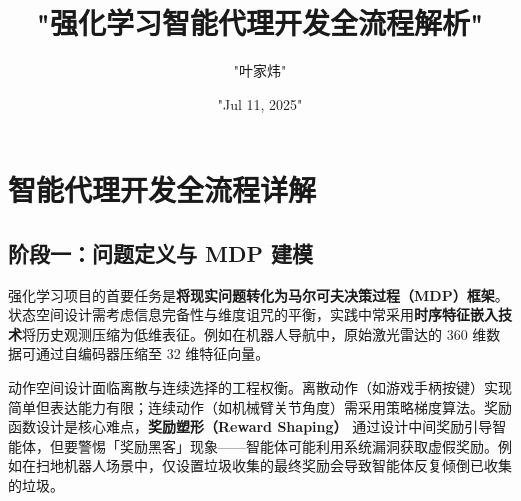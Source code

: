 \title{"强化学习智能代理开发全流程解析"}
\author{"叶家炜"}
\date{"Jul 11, 2025"}
\maketitle
\chapter{智能代理开发全流程详解}
\section{阶段一：问题定义与 MDP 建模}
强化学习项目的首要任务是\textbf{将现实问题转化为马尔可夫决策过程（MDP）框架}。状态空间设计需考虑信息完备性与维度诅咒的平衡，实践中常采用\textbf{时序特征嵌入技术}将历史观测压缩为低维表征。例如在机器人导航中，原始激光雷达的 360 维数据可通过自编码器压缩至 32 维特征向量。\par
动作空间设计面临离散与连续选择的工程权衡。离散动作（如游戏手柄按键）实现简单但表达能力有限；连续动作（如机械臂关节角度）需采用策略梯度算法。奖励函数设计是核心难点，\textbf{奖励塑形（Reward Shaping）} 通过设计中间奖励引导智能体，但要警惕「奖励黑客」现象——智能体可能利用系统漏洞获取虚假奖励。例如在扫地机器人场景中，仅设置垃圾收集的最终奖励会导致智能体反复倾倒已收集的垃圾。\par
